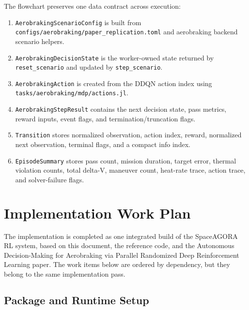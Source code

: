 \documentclass[11pt]{article}
\begin{document}
The flowchart preserves one data contract across execution:

\begin{enumerate}
\item \texttt{AerobrakingScenarioConfig} is built from \texttt{configs/aerobraking/paper\_replication.toml} and aerobraking backend scenario helpers.
\item \texttt{AerobrakingDecisionState} is the worker-owned state returned by \texttt{reset\_scenario} and updated by \texttt{step\_scenario}.
\item \texttt{AerobrakingAction} is created from the DDQN action index using \texttt{tasks/aerobraking/mdp/actions.jl}.
\item \texttt{AerobrakingStepResult} contains the next decision state, pass metrics, reward inputs, event flags, and termination/truncation flags.
\item \texttt{Transition} stores normalized observation, action index, reward, normalized next observation, terminal flags, and a compact info index.
\item \texttt{EpisodeSummary} stores pass count, mission duration, target error, thermal violation counts, total delta-V, maneuver count, heat-rate trace, action trace, and solver-failure flags.
\end{enumerate}



\section{Implementation Work Plan}

The implementation is completed as one integrated build of the SpaceAGORA RL system, based on this document, the reference code, and the Autonomous Decision-Making for Aerobraking via Parallel Randomized Deep Reinforcement Learning paper. The work items below are ordered by dependency, but they belong to the same implementation pass.

\subsection{Package and Runtime Setup}
\end{document}
